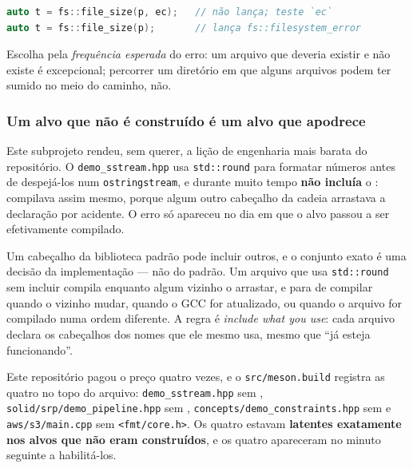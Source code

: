 \begin{lstlisting}[style=bt, language=C++,
    caption={A API dupla, e o critério de escolha.}]
auto t = fs::file_size(p, ec);   // não lança; teste `ec`
auto t = fs::file_size(p);       // lança fs::filesystem_error
\end{lstlisting}

Escolha pela \emph{frequência esperada} do erro: um arquivo que deveria existir
e não existe é excepcional; percorrer um diretório em que alguns arquivos podem
ter sumido no meio do caminho, não.

\subsubsection{Um alvo que não é construído é um alvo que apodrece}

Este subprojeto rendeu, sem querer, a lição de engenharia mais barata do
repositório. O \texttt{demo\_sstream.hpp} usa \texttt{std::round} para formatar
números antes de despejá-los num \texttt{ostringstream}, e durante muito tempo
\textbf{não incluía} o : compilava assim mesmo, porque algum
outro cabeçalho da cadeia arrastava a declaração por acidente. O erro só
apareceu no dia em que o alvo passou a ser efetivamente compilado.

\begin{armadilha}
Um cabeçalho da biblioteca padrão pode incluir outros, e o conjunto exato é uma
decisão da implementação --- não do padrão. Um arquivo que usa
\texttt{std::round} sem incluir  compila enquanto algum vizinho
o arrastar, e para de compilar quando o vizinho mudar, quando o GCC for
atualizado, ou quando o arquivo for compilado numa ordem diferente. A regra é
\emph{include what you use}: cada arquivo declara os cabeçalhos dos nomes que
ele mesmo usa, mesmo que ``já esteja funcionando''.

Este repositório pagou o preço quatro vezes, e o \texttt{src/meson.build}
registra as quatro no topo do arquivo: \texttt{demo\_sstream.hpp} sem
, \texttt{solid/srp/demo\_pipeline.hpp} sem
, \texttt{concepts/demo\_constraints.hpp} sem
 e \texttt{aws/s3/main.cpp} sem \texttt{<fmt/core.h>}. Os
quatro estavam \textbf{latentes exatamente nos alvos que não eram construídos},
e os quatro apareceram no minuto seguinte a habilitá-los.
\end{armadilha}

